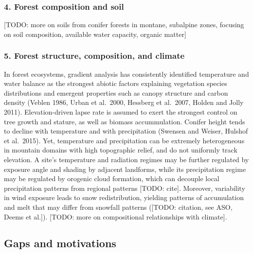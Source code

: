 \documentclass[
  12pt,
]{article}
\begin{document}
\hypertarget{forest-composition-and-soil}{%
\subsubsection{4. Forest composition and
soil}\label{forest-composition-and-soil}}

{[}TODO: more on soils from conifer forests in montane, subalpine zones,
focusing on soil composition, available water capacity, organic
matter{]}

\hypertarget{forest-structure-composition-and-climate}{%
\subsubsection{5. Forest structure, composition, and
climate}\label{forest-structure-composition-and-climate}}

In forest ecosystems, gradient analysis has consistently identified
temperature and water balance as the strongest abiotic factors
explaining vegetation species distributions and emergent properties such
as canopy structure and carbon density (Veblen 1986, Urban et al.~2000,
Hessberg et al.~2007, Holden and Jolly 2011). Elevation-driven lapse
rate is assumed to exert the strongest control on tree growth and
stature, as well as biomass accummulation. Conifer height tends to
decline with temperature and with precipitation (Swensen and Weiser,
Hulshof et al.~2015). Yet, temperature and precipitation can be
extremely heterogeneous in mountain domains with high topographic
relief, and do not uniformly track elevation. A site's temperature and
radiation regimes may be further regulated by exposure angle and shading
by adjacent landforms, while its precipitation regime may be regulated
by orogenic cloud formation, which can decouple local precipitation
patterns from regional patterns {[}TODO: cite{]}. Moreover, variability
in wind exposure leads to snow redistribution, yielding patterns of
accumulation and melt that may differ from snowfall patterns ({[}TODO:
citation, see ASO, Deems et al.{]}). {[}TODO: more on compositional
relationships with climate{]}.

\hypertarget{gaps-and-motivations}{%
\subsection{Gaps and motivations}\label{gaps-and-motivations}}
\end{document}
